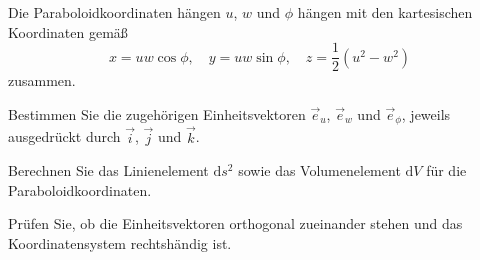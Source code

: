\begin{atiTask}[
  title = Paraboloidkoordinaten
]

Die Paraboloidkoordinaten hängen $u$, $w$ und $\phi$ hängen mit den kartesischen Koordinaten gemäß
\[
x=uw\cos \phi,\quad y=uw\sin \phi,\quad z=\frac{1}{2}(u^2-w^2)
\]
zusammen.
\begin{atiSubtasks}
	\item Bestimmen Sie die zugehörigen Einheitsvektoren $\vec{e}_u$, $\vec{e}_w$ und $\vec{e}_\phi$, jeweils ausgedrückt durch $\vec{i}$, $\vec{j}$ und $\vec{k}$.
	\item Berechnen Sie das Linienelement $\mathrm{d} s^2$ sowie das Volumenelement $\mathrm{d} V$ für die Paraboloidkoordinaten.
	\item Prüfen Sie, ob  die Einheitsvektoren orthogonal zueinander stehen und das Koordinatensystem rechtshändig ist.
\end{atiSubtasks}


\end{atiTask}

% 	
